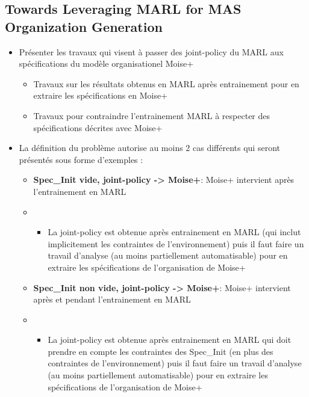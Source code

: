 \subsection{Towards Leveraging MARL for MAS Organization Generation}

\begin{itemize}

    \item Présenter les travaux qui visent à passer des joint-policy du MARL aux spécifications du modèle organisationel Moise+
          \begin{itemize}

              \item Travaux sur les résultats obtenus en MARL après entrainement pour en extraire les spécifications en Moise+
              \item Travaux pour contraindre l'entrainement MARL à respecter des spécifications décrites avec Moise+
          \end{itemize}
    \item La définition du problème autorise au moins 2 cas différents qui seront présentés sous forme d'exemples :
          \begin{itemize}
              \item \textbf{Spec\_Init vide, joint-policy -> Moise+}: Moise+ intervient après l'entrainement en MARL
              \item \begin{itemize}
                        \item La joint-policy est obtenue après entrainement en MARL (qui inclut implicitement les contraintes de l'environnement) puis il faut faire un travail d'analyse (au moins partiellement automatisable) pour en extraire les spécifications de l'organisation de Moise+
                    \end{itemize}
              \item \textbf{Spec\_Init non vide, joint-policy -> Moise+}: Moise+ intervient après et pendant l'entrainement en MARL
              \item \begin{itemize}
                        \item La joint-policy est obtenue après entrainement en MARL qui doit prendre en compte les contraintes des Spec\_Init (en plus des contraintes de l'environnement) puis il faut faire un travail d'analyse (au moins partiellement automatisable) pour en extraire les spécifications de l'organisation de Moise+
                    \end{itemize}

\end{itemize}
\end{itemize}
